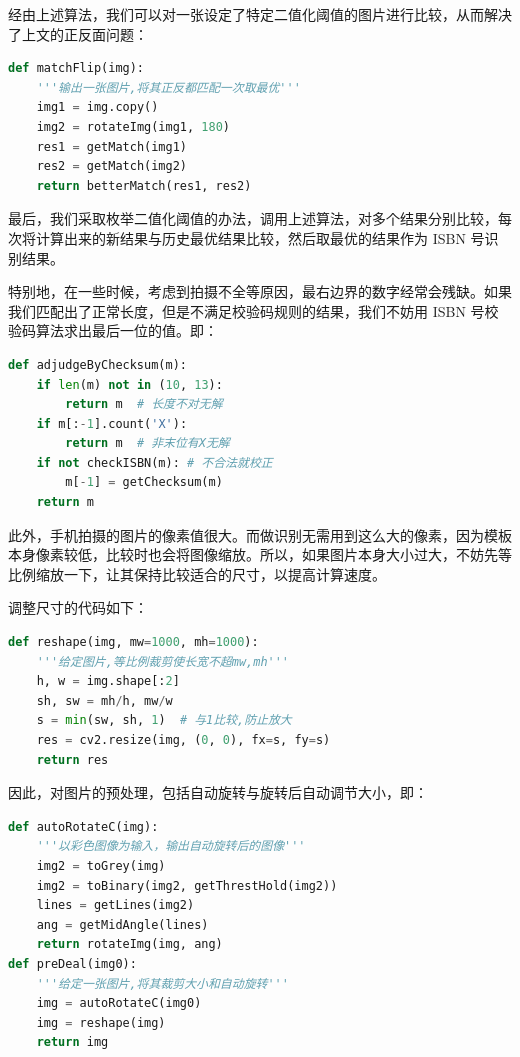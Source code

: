 \documentclass{ctexart}
\begin{document}
经由上述算法，我们可以对一张设定了特定二值化阈值的图片进行比较，从而解决了上文的正反面问题：

\begin{lstlisting}[language=python]
def matchFlip(img):
    '''输出一张图片,将其正反都匹配一次取最优'''
    img1 = img.copy()
    img2 = rotateImg(img1, 180)
    res1 = getMatch(img1)
    res2 = getMatch(img2)
    return betterMatch(res1, res2)
\end{lstlisting}

最后，我们采取枚举二值化阈值的办法，调用上述算法，对多个结果分别比较，每次将计算出来的新结果与历史最优结果比较，然后取最优的结果作为 ISBN 号识别结果。

特别地，在一些时候，考虑到拍摄不全等原因，最右边界的数字经常会残缺。如果我们匹配出了正常长度，但是不满足校验码规则的结果，我们不妨用 ISBN 号校验码算法求出最后一位的值。即：

\begin{lstlisting}[language=python]
def adjudgeByChecksum(m):
    if len(m) not in (10, 13):
        return m  # 长度不对无解
    if m[:-1].count('X'):
        return m  # 非末位有X无解
    if not checkISBN(m): # 不合法就校正
        m[-1] = getChecksum(m)
    return m 
\end{lstlisting}

此外，手机拍摄的图片的像素值很大。而做识别无需用到这么大的像素，因为模板本身像素较低，比较时也会将图像缩放。所以，如果图片本身大小过大，不妨先等比例缩放一下，让其保持比较适合的尺寸，以提高计算速度。

调整尺寸的代码如下：

\begin{lstlisting}[language=python]
def reshape(img, mw=1000, mh=1000):
    '''给定图片,等比例裁剪使长宽不超mw,mh'''
    h, w = img.shape[:2]
    sh, sw = mh/h, mw/w
    s = min(sw, sh, 1)  # 与1比较,防止放大
    res = cv2.resize(img, (0, 0), fx=s, fy=s)
    return res
\end{lstlisting}

因此，对图片的预处理，包括自动旋转与旋转后自动调节大小，即：

\begin{lstlisting}[language=python]
def autoRotateC(img):
    '''以彩色图像为输入，输出自动旋转后的图像'''
    img2 = toGrey(img)
    img2 = toBinary(img2, getThrestHold(img2))
    lines = getLines(img2)
    ang = getMidAngle(lines)
    return rotateImg(img, ang)
def preDeal(img0):
    '''给定一张图片,将其裁剪大小和自动旋转'''
    img = autoRotateC(img0)
    img = reshape(img)
    return img
\end{lstlisting}
\end{document}
